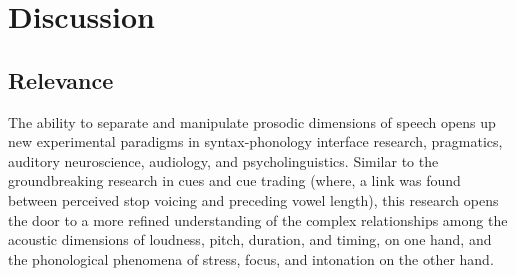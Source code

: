 \chapter{Discussion}

\section{Relevance}
The ability to separate and manipulate prosodic dimensions of speech opens up new experimental paradigms in syntax-phonology interface research, pragmatics, auditory neuroscience, audiology, and psycholinguistics.  Similar to the groundbreaking research in cues and cue trading (where, \eg a link was found between perceived stop voicing and preceding vowel length), this research opens the door to a more refined understanding of the complex relationships among the acoustic dimensions of loudness, pitch, duration, and timing, on one hand, and the phonological phenomena of stress, focus, and intonation on the other hand.

